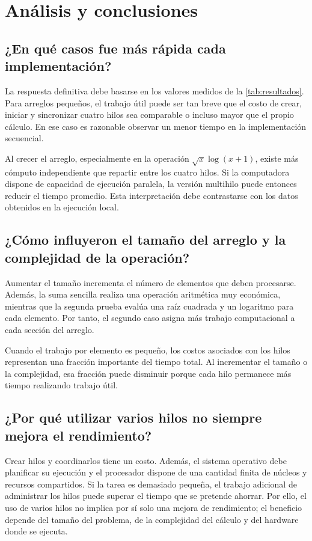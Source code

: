 \documentclass[12pt,oneside]{template/liverpoolthesis}
\begin{document}
\chapter{Análisis y conclusiones}

\section{¿En qué casos fue más rápida cada implementación?}

La respuesta definitiva debe basarse en los valores medidos de la
\autoref{tab:resultados}. Para arreglos pequeños, el trabajo útil puede ser tan
breve que el costo de crear, iniciar y sincronizar cuatro hilos sea comparable
o incluso mayor que el propio cálculo. En ese caso es razonable observar un
menor tiempo en la implementación secuencial.

Al crecer el arreglo, especialmente en la operación
\(\sqrt{x}\log(x+1)\), existe más cómputo independiente que repartir entre los
cuatro hilos. Si la computadora dispone de capacidad de ejecución paralela,
la versión multihilo puede entonces reducir el tiempo promedio. Esta
interpretación debe contrastarse con los datos obtenidos en la ejecución
local.

\section{¿Cómo influyeron el tamaño del arreglo y la complejidad de la operación?}

Aumentar el tamaño incrementa el número de elementos que deben procesarse.
Además, la suma sencilla realiza una operación aritmética muy económica,
mientras que la segunda prueba evalúa una raíz cuadrada y un logaritmo para
cada elemento. Por tanto, el segundo caso asigna más trabajo computacional a
cada sección del arreglo.

Cuando el trabajo por elemento es pequeño, los costos asociados con los hilos
representan una fracción importante del tiempo total. Al incrementar el tamaño
o la complejidad, esa fracción puede disminuir porque cada hilo permanece más
tiempo realizando trabajo útil.

\section{¿Por qué utilizar varios hilos no siempre mejora el rendimiento?}

Crear hilos y coordinarlos tiene un costo. Además, el sistema operativo debe
planificar su ejecución y el procesador dispone de una cantidad finita de
núcleos y recursos compartidos. Si la tarea es demasiado pequeña, el trabajo
adicional de administrar los hilos puede superar el tiempo que se pretende
ahorrar. Por ello, el uso de varios hilos no implica por sí solo una mejora de
rendimiento; el beneficio depende del tamaño del problema, de la complejidad
del cálculo y del hardware donde se ejecuta.
\end{document}
